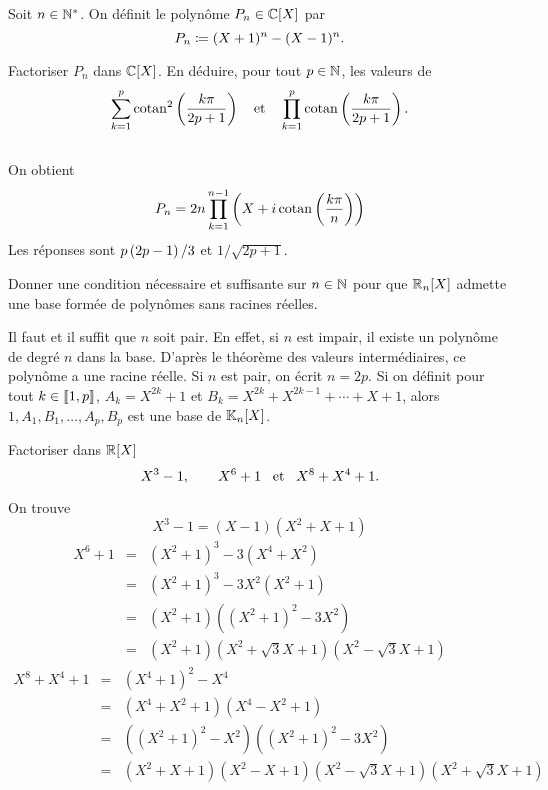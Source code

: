 \documentclass{magnolia}
\begin{document}
Soit $n\in{\mathbb{N}^*}$. On définit le polynôme $P_n\in\polyC$ par
\[P_n\coloneqq (X+1)^{n}-(X-1)^{n}.\]
\begin{questions}
\question Factoriser $P_n$ dans $\polyC$.
\question En déduire, pour tout $p\in\mathbb{N}$, les valeurs de
  \[\sum_{k=1}^p \operatorname{cotan}^2\left(\frac{k\pi}{2p+1}\right)
    \quad \text{et}
    \quad \prod_{k=1}^p \operatorname{cotan}\left(\frac{k\pi}{2p+1}\right).\]
\end{questions}
\begin{sol}
$\quad$
\begin{questions}
\question On obtient
  \[P_n=2n\prod_{k=1}^{n-1} \left(X+i\operatorname{cotan}\left(\frac{k\pi}{n}\right)\right)\]
\question Les réponses sont $p\left(2p-1\right)/3$ et $1/\sqrt{2p+1}$.
\end{questions}
\end{sol}

Donner une condition nécessaire et suffisante sur $n\in\mathbb{N}$ pour que
$\polyR[n]$ admette une base formée de polynômes sans racines réelles.
\begin{sol}
Il faut et il suffit que $n$ soit pair. En effet, si $n$ est impair, il existe
un polynôme de degré $n$ dans la base. D'après le théorème des valeurs
intermédiaires, ce polynôme a une racine réelle. Si $n$ est pair, on
écrit $n=2p$. Si on définit pour tout $k\in\left\llbracket 1,p\right\rrbracket$,
$A_k=X^{2k}+1$ et $B_k=X^{2k}+X^{2k-1}+\cdots+X+1$, alors
$1,A_1,B_1,\ldots,A_p,B_p$ est une base de $\polyK[n]$.
\end{sol}

Factoriser dans $\polyR$
\[X^3-1, \qquad X^6+1 \quad\!\text{et}\quad\! X^8+X^4+1.\]
\begin{sol}
On trouve
\[X^3-1=(X-1)(X^2+X+1)\]
\begin{eqnarray*}
X^6+1&=&(X^2+1)^3-3(X^4+X^2)\\
     &=&(X^2+1)^3-3X^2(X^2+1)\\
     &=&(X^2+1)((X^2+1)^2-3X^2)\\
     &=&(X^2+1)(X^2+\sqrt{3}X+1)(X^2-\sqrt{3}X+1)
\end{eqnarray*}
\begin{eqnarray*}
X^8+X^4+1&=&(X^4+1)^2-X^4\\
         &=&(X^4+X^2+1)(X^4-X^2+1)\\
         &=&((X^2+1)^2-X^2)((X^2+1)^2-3X^2)\\
         &=&(X^2+X+1)(X^2-X+1)(X^2-\sqrt{3}X+1)(X^2+\sqrt{3}X+1)
\end{eqnarray*}
\end{sol}
\end{document}
